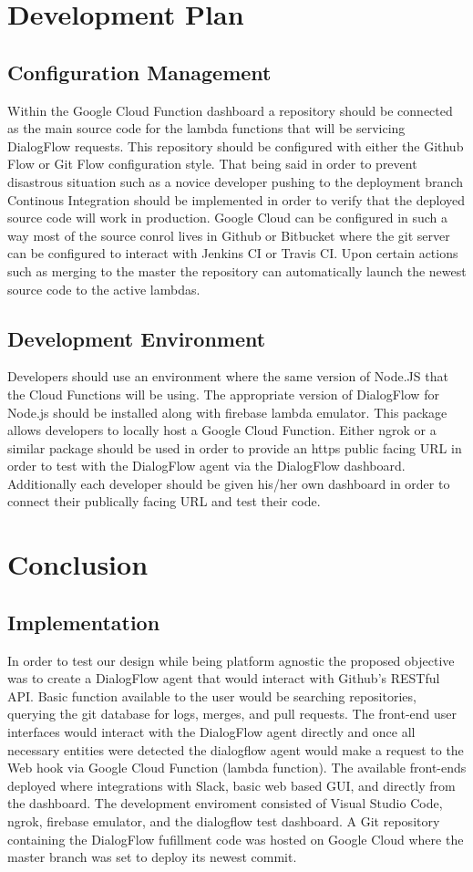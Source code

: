 \documentclass[9pt,software]{livecoms}
\begin{document}
\section{Development Plan}
\subsection{Configuration Management}
Within the Google Cloud Function dashboard a repository should be connected as the main source code for the lambda functions that will be servicing DialogFlow requests. This repository should be configured
with either the Github Flow or Git Flow configuration style. That being said in order to prevent disastrous situation such as a novice developer pushing to the deployment branch Continous Integration should
be implemented in order to verify that the deployed source code will work in production. Google Cloud can be configured in such a way most of the source conrol lives in Github or Bitbucket where the git server
can be configured to interact with Jenkins CI or Travis CI. Upon certain actions such as merging to the master the repository can automatically launch the newest source code
to the active lambdas.

\subsection{Development Environment}
Developers should use an environment where the same version of Node.JS that the Cloud Functions will be using. The appropriate version of DialogFlow for Node.js should be installed along with firebase lambda emulator.
This package allows developers to locally host a Google Cloud Function. Either ngrok or a similar package should be used in order to provide an https public facing URL in order to test with the DialogFlow 
agent via the DialogFlow dashboard. Additionally each developer should be given his/her own dashboard in order to connect their publically facing URL and test their code.

\section{Conclusion}
\subsection{Implementation}
In order to test our design while being platform agnostic the proposed objective was to create a DialogFlow agent that would interact with Github's RESTful API. Basic function available to the user would be searching
repositories, querying the git database for logs, merges, and pull requests. The front-end user interfaces would interact with the DialogFlow agent directly and once all necessary entities were detected the dialogflow agent
would make a request to the Web hook via Google Cloud Function (lambda function). The available front-ends deployed where integrations with Slack, basic web based GUI, and directly from the dashboard. The development enviroment 
consisted of Visual Studio Code, ngrok, firebase emulator, and the dialogflow test dashboard. A Git repository containing the DialogFlow fufillment code was hosted on Google Cloud where the master branch was set to deploy its newest commit.
\end{document}

